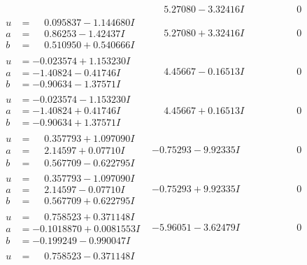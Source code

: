 \documentclass[1p]{elsarticle_modified}
\theoremstyle{definition}
\begin{document}
$$\begin{array}{c|c|c}
 & \phantom{-}5.27080 - 3.32416 I & \phantom{-0.000000 } 0 \\ \hline\begin{aligned}
u &= \phantom{-}0.095837 - 1.144680 I \\
a &= \phantom{-}0.86253 - 1.42437 I \\
b &= \phantom{-}0.510950 + 0.540666 I\end{aligned}
 & \phantom{-}5.27080 + 3.32416 I & \phantom{-0.000000 } 0 \\ \hline\begin{aligned}
u &= -0.023574 + 1.153230 I \\
a &= -1.40824 - 0.41746 I \\
b &= -0.90634 - 1.37571 I\end{aligned}
 & \phantom{-}4.45667 - 0.16513 I & \phantom{-0.000000 } 0 \\ \hline\begin{aligned}
u &= -0.023574 - 1.153230 I \\
a &= -1.40824 + 0.41746 I \\
b &= -0.90634 + 1.37571 I\end{aligned}
 & \phantom{-}4.45667 + 0.16513 I & \phantom{-0.000000 } 0 \\ \hline\begin{aligned}
u &= \phantom{-}0.357793 + 1.097090 I \\
a &= \phantom{-}2.14597 + 0.07710 I \\
b &= \phantom{-}0.567709 - 0.622795 I\end{aligned}
 & -0.75293 - 9.92335 I & \phantom{-0.000000 } 0 \\ \hline\begin{aligned}
u &= \phantom{-}0.357793 - 1.097090 I \\
a &= \phantom{-}2.14597 - 0.07710 I \\
b &= \phantom{-}0.567709 + 0.622795 I\end{aligned}
 & -0.75293 + 9.92335 I & \phantom{-0.000000 } 0 \\ \hline\begin{aligned}
u &= \phantom{-}0.758523 + 0.371148 I \\
a &= -0.1018870 + 0.0081553 I \\
b &= -0.199249 - 0.990047 I\end{aligned}
 & -5.96051 - 3.62479 I & \phantom{-0.000000 } 0 \\ \hline\begin{aligned}
u &= \phantom{-}0.758523 - 0.371148 I \\

\end{aligned}
\end{array}$$
\end{document}

